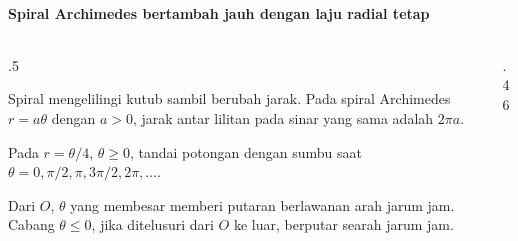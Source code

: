 \documentclass{../../kalkulus-ppt}
\newcommand{\sumbubidang}[4]{%
    \draw[sumbu] (#1,0) -- (#2,0) node[right,font=\scriptsize] {$x$};
    \draw[sumbu] (0,#3) -- (0,#4) node[above,font=\scriptsize] {$y$};
}
\begin{document}
\begin{frame}{\insertsection}
    \framesubtitle{Spiral Archimedes bertambah jauh dengan laju radial tetap}
    \begin{columns}[c,onlytextwidth]
        \begin{column}{.5\textwidth}
            \begin{definisi}
                Spiral mengelilingi kutub sambil berubah jarak.
                Pada spiral Archimedes $r=a\theta$ dengan $a>0$,
                jarak antar lilitan pada sinar yang sama adalah $2\pi a$.
            \end{definisi}
            \begin{contoh}
                Pada $r=\theta/4$, $\theta\ge0$, tandai
                potongan dengan sumbu saat
                $\theta=0,\pi/2,\pi,3\pi/2,2\pi,\ldots$.
            \end{contoh}
            Dari $O$, $\theta$ yang membesar memberi putaran
            berlawanan arah jarum jam. Cabang $\theta\le0$,
            jika ditelusuri dari $O$ ke luar, berputar searah jarum jam.
        \end{column}
        \begin{column}{.46\textwidth}
            \centering
        \end{column}
    \end{columns}
\end{frame}
\end{document}
